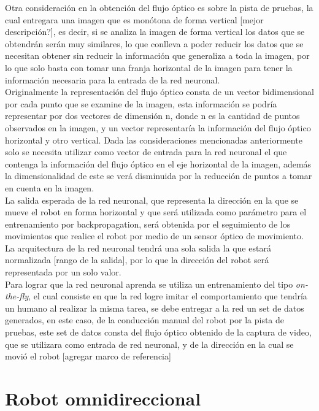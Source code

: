 \documentclass{iccmemoria}
\begin{document}
Otra consideración en la obtención del flujo óptico es sobre la pista de pruebas, la cual entregara una imagen que es monótona de forma vertical [mejor descripción?], es decir, si se analiza la imagen de forma vertical los datos que se obtendrán serán muy similares, lo que conlleva a poder reducir los datos que se necesitan obtener sin reducir la información que generaliza a toda la imagen, por lo que solo basta con tomar una franja horizontal de la imagen para tener la información necesaria para la entrada de la red neuronal.\\

Originalmente la representación del flujo óptico consta de un vector bidimensional por cada punto que se examine de la imagen, esta información se podría representar por dos vectores de dimensión n, donde n es la cantidad de puntos observados en la imagen, y un vector representaría la información del flujo óptico horizontal y otro vertical. Dada las consideraciones mencionadas anteriormente solo se necesita utilizar como vector de entrada para la red neuronal el que contenga la información del flujo óptico en el eje horizontal de la imagen, además la dimensionalidad de este se verá disminuida por la reducción de puntos a tomar en cuenta en la imagen.\\

La salida esperada de la red neuronal, que representa la dirección en la que se mueve el robot en forma horizontal y que será utilizada como parámetro para el entrenamiento por backpropagation, será obtenida por el seguimiento de los movimientos que realice el robot por medio de un sensor óptico de movimiento. La arquitectura de la red neuronal tendrá una sola salida la que estará normalizada [rango de la salida], por lo que la dirección del robot será representada por un solo valor.\\

Para lograr que la red neuronal aprenda se utiliza un entrenamiento del tipo \emph{on-the-fly}, el cual consiste en que la red logre imitar el comportamiento que tendría un humano al realizar la misma tarea, se debe entregar a la red un set de datos generados, en este caso, de la conducción manual del robot por la pista de pruebas, este set de datos consta del flujo óptico obtenido de la captura de video, que se utilizara como entrada de red neuronal, y de la dirección en la cual se movió el robot [agregar marco de referencia] \\

\section{Robot omnidireccional}
\end{document}
